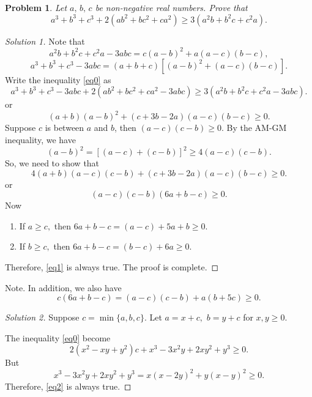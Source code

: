 \documentclass[12pt,a4paper]{book}
\theoremstyle{plain}
\newtheorem*{pro}{\cmss\problemColor Problem}
\begin{document}
\begin{pro}
Let $a,\,b,\,c$ be non-negative real numbers. Prove that
\begin{equation}\label{eq0}
a^3+b^3+c^3+2(ab^2+bc^2+ca^2) \geqslant 3(a^2b+b^2c+c^2a).
\end{equation}
\end{pro}

\begin{proof}[\cmss\problemColor Solution 1]
Note that
\[a^2b+b^2c+c^2a-3abc = c(a-b)^2 + a(a-c)(b-c),\]
\[a^3+b^3+c^3-3abc=(a+b+c)[(a-b)^2+(a-c)(b-c)].\]
Write the inequality \eqref{eq0} as
\[a^3+b^3+c^3-3abc+2(ab^2+bc^2+ca^2-3abc) \ge 3(a^2b+b^2c+c^2a-3abc).\]
or
\[(a+b)(a-b)^2 + (c+3b-2a)(a-c)(b-c) \geqslant 0.\]
Suppose \( c \) is between \( a \) and \( b \), then $(a-c)(c-b) \ge 0.$ By the AM-GM inequality, we have
$$(a-b)^2=[(a-c)+(c-b)]^2 \ge 4(a-c)(c-b).$$
So, we need to show that
\[4(a+b)(a-c)(c-b) + (c+3b-2a)(a-c)(b-c) \geqslant 0.\]
or
\begin{equation}\label{eq1}
(a-c)(c-b)(6a+b-c) \ge 0.
\end{equation} 
Now
\begin{enumerate}[\textbullet]
\item  If $a \geqslant c,$ then $6a+b-c = (a-c)+5a+b\ge0.$
\item  If $b \geqslant c,$ then $6a+b-c = (b-c)+6a \ge 0.$
\end{enumerate}
Therefore, \eqref{eq1} is always true. The proof is complete.
\end{proof}

{\cmss\problemColor Note.} In addition, we also have
\[c(6a+b-c) = (a-c)(c-b)+a(b+5c) \ge 0.\]

\begin{proof}[\cmss\problemColor Solution 2] 
Suppose $c=\min\{a,b,c\}.$ Let 
$a=x+c,$ $b=y+c $ for $x,y \ge 0.$ 

The inequality \eqref{eq0} become
\begin{equation}\label{eq2}
2(x^2-xy+y^2)c+x^3-3x^2y+2xy^2+y^3 \geqslant 0.
\end{equation}
But
\[x^3-3x^2y+2xy^2+y^3 = x(x-2y)^2+y(x-y)^2 \ge 0.\]
Therefore, \eqref{eq2} is always true.
\end{proof}
\end{document}
